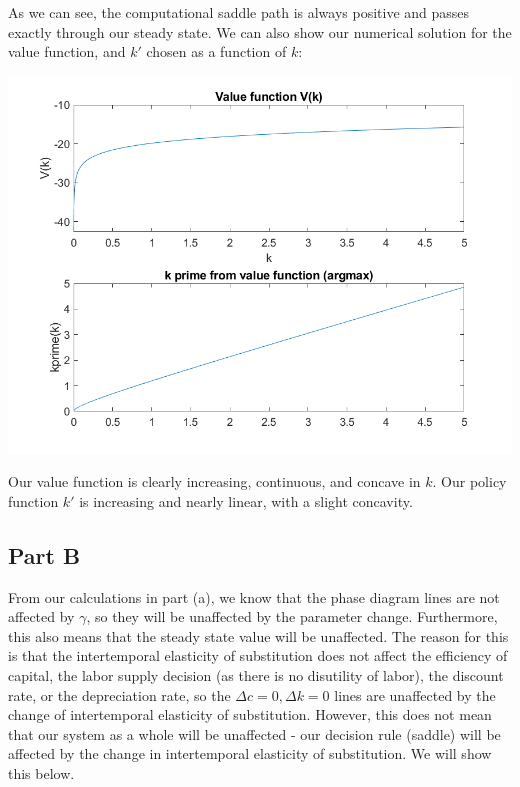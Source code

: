 \documentclass[11pt]{article} %
\begin{document}
As we can see, the computational saddle path is always positive and passes exactly through our steady state. We can also show our numerical solution for the value function, and $k'$ chosen as a function of $k$:

\includegraphics{partA2}

Our value function is clearly increasing, continuous, and concave in $k$. Our policy function $k'$ is increasing and nearly linear, with a slight concavity.

\subsection{Part B}

From our calculations in part (a), we know that the phase diagram lines are not affected by $\gamma$, so they will be unaffected by the parameter change. Furthermore, this also means that the steady state value will be unaffected. The reason for this is that the intertemporal elasticity of substitution does not affect the efficiency of capital, the labor supply decision (as there is no disutility of labor), the discount rate, or the depreciation rate, so the $\Delta c = 0,\Delta k = 0$ lines are unaffected by the change of intertemporal elasticity of substitution. However, this does not mean that our system as a whole will be unaffected - our decision rule (saddle) will be affected by the change in intertemporal elasticity of substitution. We will show this below.
\end{document}
